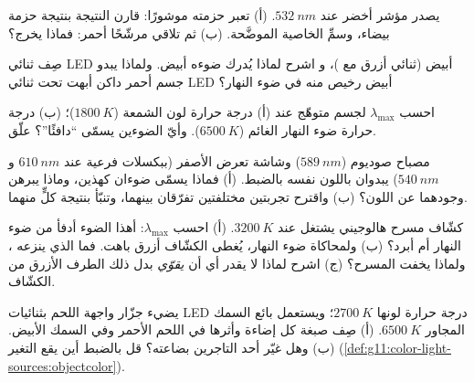 \begin{exercise}[$\star\star$]\label{exo:g11:color-light-sources:9}
يصدر مؤشر  أخضر عند $\qty{532}{nm}$. (أ) تعبر حزمته
موشورًا: قارن النتيجة بنتيجة حزمة بيضاء، وسمِّ
الخاصية الموضَّحة. (ب) ثم تلاقي مرشّحًا أحمر: فماذا يخرج؟
\end{exercise}

\begin{exercise}[$\star\star$]\label{exo:g11:color-light-sources:10}
صِف  ثنائي LED أبيض (ثنائي أزرق مع )، و
اشرح لماذا يُدرك ضوءه أبيض. ولماذا يبدو جسم أحمر داكن
أبهت تحت ثنائي LED أبيض رخيص منه في ضوء النهار؟
\end{exercise}

\begin{exercise}[$\star\star$]\label{exo:g11:color-light-sources:11}
احسب $\lambda_{\max}$ لجسم متوهّج عند (أ) درجة حرارة لون الشمعة
($\qty{1800}{K}$)؛ (ب) درجة حرارة ضوء النهار الغائم
($\qty{6500}{K}$). وأيّ الضوءين يسمّى ``دافئًا''؟ علّق.
\end{exercise}

\begin{exercise}[$\star\star\star$]\label{exo:g11:color-light-sources:12}
مصباح صوديوم ($\qty{589}{nm}$) وشاشة تعرض الأصفر
(ببكسلات فرعية عند $\qty{610}{nm}$ و$\qty{540}{nm}$) يبدوان باللون
نفسه بالضبط. (أ) فماذا يسمّى ضوءان كهذين، وماذا يبرهن
وجودهما عن اللون؟ (ب) واقترح تجربتين مختلفتين
تفرّقان بينهما، وتنبّأ بنتيجة كلٍّ منهما.
\end{exercise}

\begin{exercise}[$\star\star\star$]\label{exo:g11:color-light-sources:13}
كشّاف مسرح هالوجيني يشتغل عند $\qty{3200}{K}$. (أ) احسب
$\lambda_{\max}$: أهذا الضوء أدفأ من ضوء النهار أم أبرد؟ (ب) ولمحاكاة
ضوء النهار، يُغطى الكشّاف  أزرق باهت. فما الذي ينزعه ، ولماذا
يخفت المسرح؟ (ج) اشرح لماذا لا يقدر أي  أن \emph{يقوّي} بدل ذلك
الطرف الأزرق من  الكشّاف.
\end{exercise}

\begin{exercise}[$\star\star\star$]\label{exo:g11:color-light-sources:14}
يضيء جزّار واجهة اللحم بثنائيات LED درجة حرارة لونها
$\qty{2700}{K}$؛ ويستعمل بائع السمك المجاور $\qty{6500}{K}$.
(أ) صِف صبغة كل إضاءة وأثرها في اللحم الأحمر وفي
السمك الأبيض. (ب) وهل غيّر أحد التاجرين بضاعته؟ قل بالضبط
أين يقع التغير (\cref{def:g11:color-light-sources:objectcolor}).
\end{exercise}

